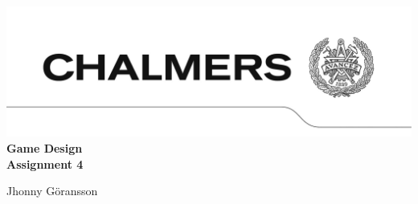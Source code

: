 \begin{titlepage}
\hspace*{-126pt}
\setlength{\voffset}{-129pt}
\enlargethispage{200pt}
\includegraphics[width=\paperwidth,keepaspectratio=true]{img/avancez.png}
\vspace*{130pt}\\
{\Huge\textbf{Game Design\\Assignment 4}}
\vspace*{30pt}\\
\begin{minipage}{0.4\textwidth}
\begin{flushleft}
Jhonny Göransson\\
\end{flushleft}
\end{minipage}
\vspace*{110pt}\\
\end{titlepage}


